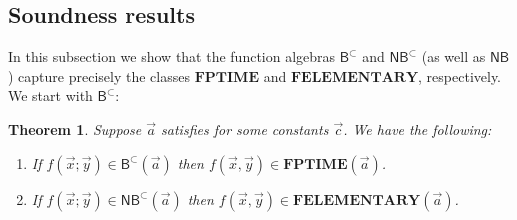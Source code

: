 \documentclass[10pt,a4paper]{amsart}
\newtheorem{thm}{Theorem}
\theoremstyle{definition}
\theoremstyle{remark}
\newcommand{\permpref}{\subset}
\newcommand{\ptime}{\mathbf{PTIME}}
\newcommand{\pspace}{\mathbf{PSPACE}}
\newcommand{\elementary}{\mathbf{ELEMENTARY}}
\newcommand{\f}{\mathbf{F}}
\newcommand{\fptime}{\f\ptime}
\newcommand{\fpspace}{\f\pspace}
\newcommand{\felementary}{\f\elementary}
\newcommand{\sumlen}[1]{|\hspace{-.15em}|#1|\hspace{-.15em}|}
\newcommand{\bc}{\mathsf{B}}
\newcommand{\bcwfpo}[1]{\bc^{#1}}
\newcommand{\nested}{\mathsf{N}}
\newcommand{\nbc}{\nested\bc}
\newcommand{\nbcwfpo}[1]{\nested\bcwfpo{#1}}
\newcommand{\shallow}{\mathsf{S}}
\newcommand{\sbc}{\shallow\bc}
\newcommand{\sbcwfpo}[1]{\sbc^{#1}}
\newcommand{\bcpp}{\bcwfpo{\permpref}}
\newcommand{\nbcpp}{\nbcwfpo{\permpref}}
\newcommand{\sbcpp}{\sbcwfpo\permpref}
\begin{document}

\subsection{Soundness results}
In this subsection we  show that the function algebras $\bcpp$ and $\nbcpp$ (as well as $\nbc$)  capture precisely the classes  $\fptime$ and $\felementary$, respectively. We start with $\bcpp$:


\begin{thm}
\label{thm:fp-soundness}
Suppose $\vec a$ satisfies  for some constants $\vec c$.
We have the following:
\begin{enumerate}
    \item\label{item:soundness-fp} If $f(\vec x;\vec y) \in \bcpp (\vec a)$ then $f(\vec x,\vec y) \in \fptime(\vec a)$.
    \item\label{item:soundness-felementary} If $f(\vec x;\vec y) \in \nbcpp (\vec a)$ then $f(\vec x,\vec y) \in \felementary(\vec a)$.
\end{enumerate}
\end{thm}
\end{document}
